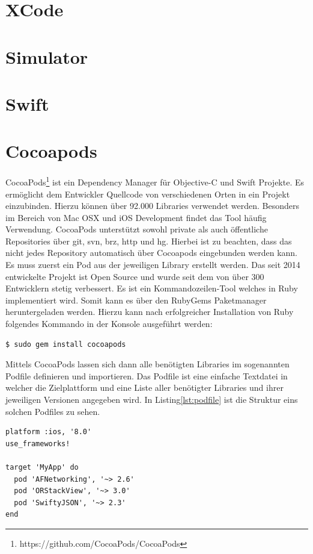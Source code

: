     \section{XCode}\label{sec:xcode}


    \section{Simulator}\label{sec:simulator}




    \section{Swift}\label{sec:swift}

    \newpage
    \section{Cocoapods}\label{sec:cocoapods}
    CocoaPods\footnote{https://github.com/CocoaPods/CocoaPods} ist ein Dependency Manager für Objective-C und Swift Projekte.
    Es ermöglicht dem Entwickler Quellcode von verschiedenen Orten in ein Projekt einzubinden.
    Hierzu können über 92.000 Libraries verwendet werden.
    Besonders im Bereich von Mac OSX und iOS Development findet das Tool häufig Verwendung.
    CocoaPods unterstützt sowohl private als auch öffentliche Repositories über git, svn, brz, http und hg.
    Hierbei ist zu beachten, dass das nicht jedes Repository automatisch über Cocoapods eingebunden werden kann.
    Es muss zuerst ein Pod aus der jeweiligen Library erstellt werden.
    Das seit 2014 entwickelte Projekt ist Open Source und wurde seit dem von über 300 Entwicklern stetig verbessert.
    Es ist ein Kommandozeilen-Tool welches in Ruby implementiert wird.
    Somit kann es über den RubyGems Paketmanager heruntergeladen werden.
    Hierzu kann nach erfolgreicher Installation von Ruby folgendes Kommando in der Konsole ausgeführt werden:
    \begin{lstlisting}[language=bash,label={lst:cocoapods}]
        $ sudo gem install cocoapods
    \end{lstlisting}
    Mittels CocoaPods lassen sich dann alle benötigten Libraries im sogenannten Podfile definieren und importieren.
    Das Podfile ist eine einfache Textdatei in welcher die Zielplattform und eine Liste aller benötigter Libraries und ihrer jeweiligen Versionen angegeben wird.
    In Listing\ref{lst:podfile} ist die Struktur eins solchen Podfiles zu sehen.
    ~\cite{cocoapods1, cocoapods2, cocoapods3}
    \begin{lstlisting}[language={},firstnumber=1,label={lst:podfile},caption={Beispielstuktur eines Podfiles},captionpos=t]
platform :ios, '8.0'
use_frameworks!

target 'MyApp' do
  pod 'AFNetworking', '~> 2.6'
  pod 'ORStackView', '~> 3.0'
  pod 'SwiftyJSON', '~> 2.3'
end
    \end{lstlisting}


